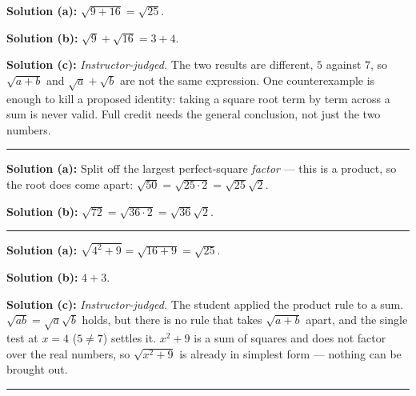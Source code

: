 \documentclass[12pt]{article}
\begin{document}



\textbf{Solution (a):} $\sqrt{9+16} = \sqrt{25}$. 

\textbf{Solution (b):} $\sqrt{9} + \sqrt{16} = 3 + 4$. 

\textbf{Solution (c):} \emph{Instructor-judged.} The two results are different,
$5$ against $7$, so $\sqrt{a+b}$ and $\sqrt{a}+\sqrt{b}$ are not the same
expression. One counterexample is enough to kill a proposed identity: taking a
square root term by term across a sum is never valid. Full credit needs the
general conclusion, not just the two numbers.

\vspace{0.2cm}\noindent\rule{\linewidth}{0.2pt}\vspace{0.2cm}


\textbf{Solution (a):} Split off the largest perfect-square \emph{factor} ---
this is a product, so the root does come apart:
$\sqrt{50} = \sqrt{25 \cdot 2} = \sqrt{25}\sqrt{2}$. 

\textbf{Solution (b):} $\sqrt{72} = \sqrt{36 \cdot 2} = \sqrt{36}\sqrt{2}$.

\vspace{0.2cm}\noindent\rule{\linewidth}{0.2pt}\vspace{0.2cm}


\textbf{Solution (a):} $\sqrt{4^2+9} = \sqrt{16+9} = \sqrt{25}$. 

\textbf{Solution (b):} $4 + 3$. 

\textbf{Solution (c):} \emph{Instructor-judged.} The student applied the product
rule to a sum. $\sqrt{ab} = \sqrt{a}\sqrt{b}$ holds, but there is no rule that
takes $\sqrt{a+b}$ apart, and the single test at $x=4$ ($5 \ne 7$) settles it.
$x^2+9$ is a sum of squares and does not factor over the real numbers, so
$\sqrt{x^2+9}$ is already in simplest form --- nothing can be brought out.

\vspace{0.2cm}\noindent\rule{\linewidth}{0.2pt}\vspace{0.2cm}
\end{document}
